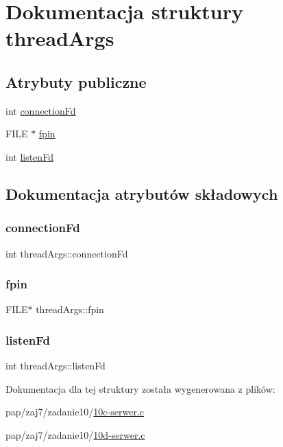 \hypertarget{structthreadArgs}{}\section{Dokumentacja struktury thread\+Args}
\label{structthreadArgs}
\subsection*{Atrybuty publiczne}
\begin{DoxyCompactItemize}
\item 
int \mbox{\hyperlink{structthreadArgs_a6dbd124d6ea6c04faa6aa140851173fd}{connection\+Fd}}
\item 
F\+I\+LE $\ast$ \mbox{\hyperlink{structthreadArgs_a5323a6d6177a4a242c3734a36a0db6db}{fpin}}
\item 
int \mbox{\hyperlink{structthreadArgs_af78495f87d8fb8f0b497cbb67a6444ab}{listen\+Fd}}
\end{DoxyCompactItemize}


\subsection{Dokumentacja atrybutów składowych}
\mbox{\label{structthreadArgs_a6dbd124d6ea6c04faa6aa140851173fd}} 
\subsubsection{\texorpdfstring{connectionFd}{connectionFd}}
{\footnotesize\ttfamily int thread\+Args\+::connection\+Fd}

\mbox{\label{structthreadArgs_a5323a6d6177a4a242c3734a36a0db6db}} 
\subsubsection{\texorpdfstring{fpin}{fpin}}
{\footnotesize\ttfamily F\+I\+LE$\ast$ thread\+Args\+::fpin}

\mbox{\label{structthreadArgs_af78495f87d8fb8f0b497cbb67a6444ab}} 
\subsubsection{\texorpdfstring{listenFd}{listenFd}}
{\footnotesize\ttfamily int thread\+Args\+::listen\+Fd}



Dokumentacja dla tej struktury została wygenerowana z plików\+:\begin{DoxyCompactItemize}
\item 
pap/zaj7/zadanie10/\mbox{\hyperlink{10c-serwer_8c}{10c-\/serwer.\+c}}\item 
pap/zaj7/zadanie10/\mbox{\hyperlink{10d-serwer_8c}{10d-\/serwer.\+c}}\end{DoxyCompactItemize}
